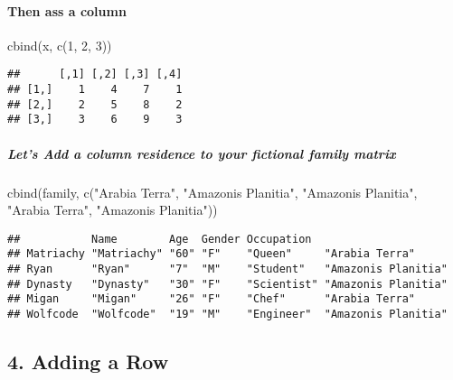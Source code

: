 \documentclass[
]{article}
\newenvironment{Shaded}{\begin{snugshade}}{\end{snugshade}}
\newcommand{\DecValTok}[1]{\textcolor[rgb]{0.00,0.00,0.81}{#1}}
\newcommand{\FunctionTok}[1]{\textcolor[rgb]{0.00,0.00,0.00}{#1}}
\newcommand{\NormalTok}[1]{#1}
\newcommand{\StringTok}[1]{\textcolor[rgb]{0.31,0.60,0.02}{#1}}
\begin{document}
\hypertarget{then-ass-a-column}{%
\paragraph{Then ass a column}\label{then-ass-a-column}}

\begin{Shaded}
\begin{Highlighting}[]
\FunctionTok{cbind}\NormalTok{(x, }\FunctionTok{c}\NormalTok{(}\DecValTok{1}\NormalTok{, }\DecValTok{2}\NormalTok{, }\DecValTok{3}\NormalTok{))}
\end{Highlighting}
\end{Shaded}

\begin{verbatim}
##      [,1] [,2] [,3] [,4]
## [1,]    1    4    7    1
## [2,]    2    5    8    2
## [3,]    3    6    9    3
\end{verbatim}

\hypertarget{lets-add-a-column-residence-to-your-fictional-family-matrix}{%
\subparagraph{Let's Add a column residence to your fictional family
matrix}\label{lets-add-a-column-residence-to-your-fictional-family-matrix}}

\begin{Shaded}
\begin{Highlighting}[]
\FunctionTok{cbind}\NormalTok{(family, }\FunctionTok{c}\NormalTok{(}\StringTok{"Arabia Terra"}\NormalTok{, }\StringTok{"Amazonis Planitia"}\NormalTok{, }\StringTok{"Amazonis Planitia"}\NormalTok{, }\StringTok{"Arabia Terra"}\NormalTok{, }\StringTok{"Amazonis Planitia"}\NormalTok{))}
\end{Highlighting}
\end{Shaded}

\begin{verbatim}
##           Name        Age  Gender Occupation                     
## Matriachy "Matriachy" "60" "F"    "Queen"     "Arabia Terra"     
## Ryan      "Ryan"      "7"  "M"    "Student"   "Amazonis Planitia"
## Dynasty   "Dynasty"   "30" "F"    "Scientist" "Amazonis Planitia"
## Migan     "Migan"     "26" "F"    "Chef"      "Arabia Terra"     
## Wolfcode  "Wolfcode"  "19" "M"    "Engineer"  "Amazonis Planitia"
\end{verbatim}

\hypertarget{adding-a-row}{%
\subsection{4. Adding a Row}\label{adding-a-row}}
\end{document}
